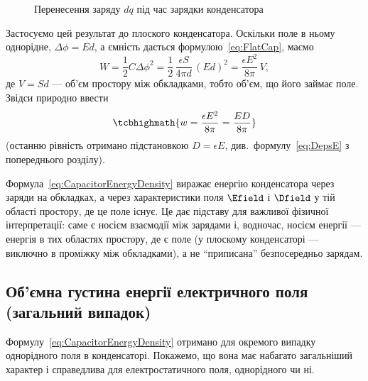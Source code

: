\begin{figure}\centering
	\caption{Перенесення заряду $dq$ під час зарядки конденсатора\label{pic:CapacitorDq}}
\end{figure}

Застосуємо цей результат до плоского конденсатора. Оскільки поле в ньому однорідне, $\Delta\phi = Ed$, а ємність дається
формулою~\eqref{eq:FlatCap}, маємо
\begin{equation*}
	W = \frac12 C \Delta\phi^2 = \frac12\,\frac{\epsilon S}{4\pi d}\,(Ed)^2 = \frac{\epsilon E^2}{8\pi}\, V,
\end{equation*}
де $V = Sd$ --- об'єм простору між обкладками, тобто об'єм, що його займає поле. Звідси природно ввести 
\begin{equation}\label{eq:CapacitorEnergyDensity}
	\tcbhighmath{
		w = \frac{\epsilon E^2}{8\pi} = \frac{ED}{8\pi}
	}
\end{equation}
(останню рівність отримано підстановкою $D = \epsilon E$, див.~формулу~\eqref{eq:DepsE} з попереднього розділу).

\begin{Attention}
	Формула~\eqref{eq:CapacitorEnergyDensity} виражає енергію конденсатора  через заряди на обкладках, а через характеристики поля $\Efield$ і
	$\Dfield$ у тій області простору, де це поле існує. Це дає підставу для важливої фізичної інтерпретації: саме  є носієм
	взаємодії між зарядами і, водночас, носієм енергії --- енергія  в тих областях простору, де є поле (у плоскому конденсаторі
	--- виключно в проміжку між обкладками), а не \enquote{приписана} безпосередньо зарядам.
\end{Attention}

\subsection*{Об'ємна густина енергії електричного поля (загальний випадок)}\label{sec:FieldEnergyDensity}

Формулу~\eqref{eq:CapacitorEnergyDensity} отримано для окремого випадку однорідного поля в конденсаторі. Покажемо, що вона має набагато загальніший
характер і справедлива для  електростатичного поля, однорідного чи ні.

